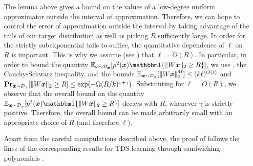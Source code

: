\documentclass[11pt]{article} %
\numberwithin{equation}{section}
\begin{document}
The lemma above gives a bound on the values of a low-degree uniform approximator outside the interval of approximation. Therefore, we can hope to control the error of approximation outside the interval by taking advantage of the tails of our target distribution as well as picking $R$ sufficiently large. In order for the strictly subexponential tails to suffice, the quantitative dependence of $\ell$ on $R$ is important. This is why we assume (see ) that $\ell = \tilde{O}(R)$. In particular, in order to bound the quantity $\E_{\x\sim\Dtrainx}[p^2(\x)\ind\{\|W\x\|_2\ge R\}]$, we use , the Cauchy-Schwarz inequality, and the bounds $\mathbb{E}_{{\bm{x}}\sim{\mathcal{D}}_{{\bm{x}}}}[\left\| {W{\bm{x}}} \right\|_2^{4\ell}] \le (k\ell)^{O(\ell)}$ and $\mathbf{Pr}_{{\bm{x}}\sim{\mathcal{D}}_{{\bm{x}}}}[\|W{\bm{x}}\|_2\ge R] \le \exp(-\Omega(R/k)^{1+\gamma})$. Substituting for $\ell = \tilde{O}(R)$, we observe that the overall bound on the quantity $\E_{\x\sim\Dtrainx}[p^2(\x)\ind\{\|W\x\|_2\ge R\}]$ decays with $R$, whenever $\gamma$ is strictly positive. Therefore, the overall bound can be made arbitrarily small with an appropriate choice of $R$ (and therefore $\ell$). 


Apart from the careful manipulations described above, the proof of  follows the lines of the corresponding results for TDS learning through sandwiching polynomials \cite{klivans2023testable}. 

\end{document}
